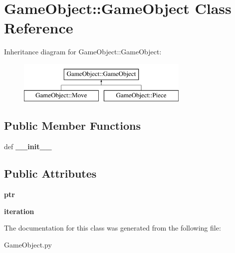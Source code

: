 \hypertarget{classGameObject_1_1GameObject}{
\section{GameObject::GameObject Class Reference}
\label{classGameObject_1_1GameObject}
}
Inheritance diagram for GameObject::GameObject:\begin{figure}[H]
\begin{center}
\leavevmode
\includegraphics[height=2.000000cm]{classGameObject_1_1GameObject}
\end{center}
\end{figure}
\subsection*{Public Member Functions}
\begin{DoxyCompactItemize}
\item 
\hypertarget{classGameObject_1_1GameObject_ab8fc51fb12907dfeb24e3396eff13252}{
def {\bfseries \_\-\_\-init\_\-\_\-}}
\label{classGameObject_1_1GameObject_ab8fc51fb12907dfeb24e3396eff13252}

\end{DoxyCompactItemize}
\subsection*{Public Attributes}
\begin{DoxyCompactItemize}
\item 
\hypertarget{classGameObject_1_1GameObject_ab09e368639157c6fa81535684ad600db}{
{\bfseries ptr}}
\label{classGameObject_1_1GameObject_ab09e368639157c6fa81535684ad600db}

\item 
\hypertarget{classGameObject_1_1GameObject_a36654bebef12ac56a2abf4988bb49c95}{
{\bfseries iteration}}
\label{classGameObject_1_1GameObject_a36654bebef12ac56a2abf4988bb49c95}

\end{DoxyCompactItemize}


The documentation for this class was generated from the following file:\begin{DoxyCompactItemize}
\item 
GameObject.py\end{DoxyCompactItemize}
